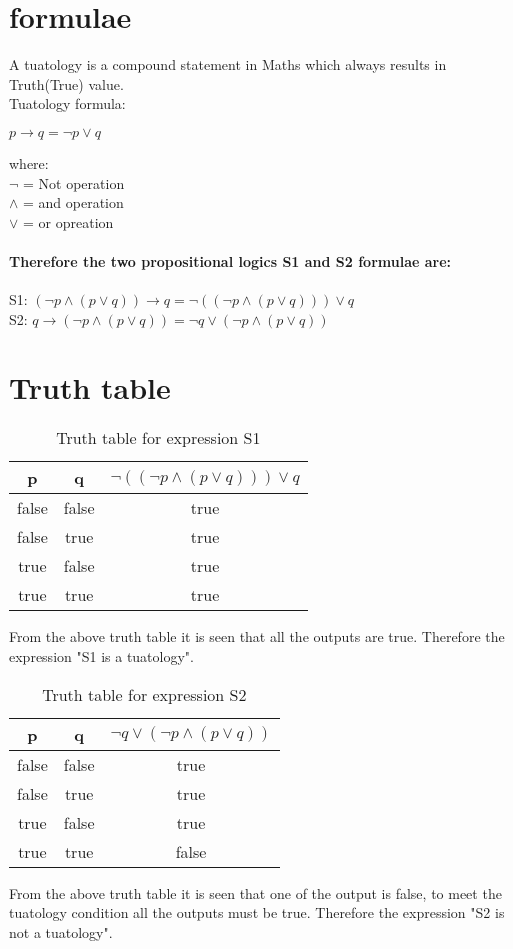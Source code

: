 \documentclass[journal,12pt,twocolumn]{IEEEtran}
\begin{document}
\section{formulae}
  A tuatology is a compound statement in Maths which always results in Truth(True) value.\\
  Tuatology formula:
\begin{center}
  $p \longrightarrow q = \neg{p} \lor{q}$
\end{center}
where:\\
$\neg{}$ = Not operation\\
$\land{}$ = and operation\\
$\lor{}$ = or opreation\\
   \paragraph{Therefore the two propositional logics S1 and S2 formulae are:}
S1: $(\neg{p} \land({p}\lor{q})) \longrightarrow q = \neg((\neg{p} \land({p}\lor{q})))\lor{q}$\\
S2: $q \longrightarrow (\neg{p}\land({p}\lor{q})) = \neg{q} \lor (\neg{p} \land ({p}\lor {q}))$
\section{Truth table}
 \begin{table}[h]
  \centering
  \caption{Truth table for expression S1}
   \begin{tabular}{|c|c|c|}
\hline
p & q & $\neg((\neg{p} \land({p}\lor{q})))\lor{q}$\\
\hline
false & false & true\\
\hline
false & true & true\\
\hline
true & false & true\\
\hline
true & true & true\\
\hline
   \end{tabular}
\end{table}
  From the above truth table it is seen that all the outputs are true. Therefore the expression "S1 is a tuatology".\\
\begin{table}[h]
  \centering
  \caption{Truth table for expression S2}
   \begin{tabular}{|c|c|c|}
\hline
p & q & $\neg{q} \lor (\neg{p} \land ({p}\lor {q}))$\\
\hline
false & false & true\\
\hline
false & true & true\\
\hline                   
true & false & true\\
\hline
true & true & false\\   
\hline
\end{tabular}
\end{table}
    From the above truth table it is seen that one of the output is false, to meet the tuatology condition all the outputs must be true. Therefore the expression "S2 is not a tuatology".\\
\end{document}
